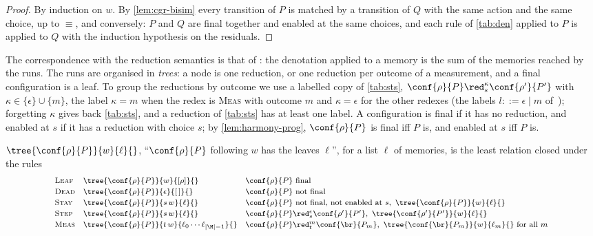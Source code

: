 \begin{proof}
By induction on $w$. By \cref{lem:cgr-bisim} every transition of $P$ is
matched by a transition of $Q$ with the same action and the same choice, up
to $\equiv$, and conversely: $P$ and $Q$ are final together and enabled at
the same choices, and each rule of \cref{tab:den} applied to $P$ is applied to
$Q$ with the induction hypothesis on the residuals.
\end{proof}

The correspondence with the reduction semantics is that of
\cite[Theorem 3.1]{UVY26}: the denotation applied to a memory is the sum of
the memories reached by the runs. The runs are organised in \emph{trees}: a
node is one reduction, or one reduction per outcome of a measurement, and a
final configuration is a leaf. To group the reductions by outcome we use a
labelled copy of \cref{tab:sts}, $\conf{\rho}{P} \red_{s}^{\kappa}
\conf{\rho'}{P'}$ with $\kappa \in \{\epsilon\} \cup \{m\}$, the label
$\kappa = m$ when the redex is \textsc{Meas} with outcome $m$ and
$\kappa = \epsilon$ for the other redexes (the labels $l ::= \epsilon \mid m$
of~\cite{UVY26}); forgetting $\kappa$ gives back \cref{tab:sts}, and a
reduction of \cref{tab:sts} has at least one label. A configuration is final
if it has no reduction, and enabled at $s$ if it has a reduction with choice
$s$; by \cref{lem:harmony-prog}, $\conf{\rho}{P}$ is final iff $P$ is, and
enabled at $s$ iff $P$ is.

\begin{definition}\label{def:tree}
$\tree{\conf{\rho}{P}}{w}{\ell}{}$, ``$\conf{\rho}{P}$ following $w$ has
the leaves $\ell$'', for a list $\ell$ of memories, is the least relation
closed under the rules
\[
\footnotesize
\begin{array}{l@{\quad}l@{\quad}l}
\textsc{Leaf} & \tree{\conf{\rho}{P}}{w}{[\rho]}{} & \conf{\rho}{P} \text{ final} \\[2pt]
\textsc{Dead} & \tree{\conf{\rho}{P}}{\epsilon}{[\,]}{} & \conf{\rho}{P} \text{ not final} \\[2pt]
\textsc{Stay} & \tree{\conf{\rho}{P}}{s\,w}{\ell}{}
  & \conf{\rho}{P} \text{ not final, not enabled at } s,\ \tree{\conf{\rho}{P}}{w}{\ell}{} \\[2pt]
\textsc{Step} & \tree{\conf{\rho}{P}}{s\,w}{\ell}{}
  & \conf{\rho}{P} \red_{s}^{\epsilon} \conf{\rho'}{P'},\ \tree{\conf{\rho'}{P'}}{w}{\ell}{} \\[2pt]
\textsc{Meas} & \tree{\conf{\rho}{P}}{t\,w}{\ell_0 \cdots \ell_{|\M|-1}}{}
  & \conf{\rho}{P} \red_{t}^{m} \conf{\br}{P_m},\ \tree{\conf{\br}{P_m}}{w}{\ell_m}{}
    \text{ for all } m
\end{array}
\]
\end{definition}

